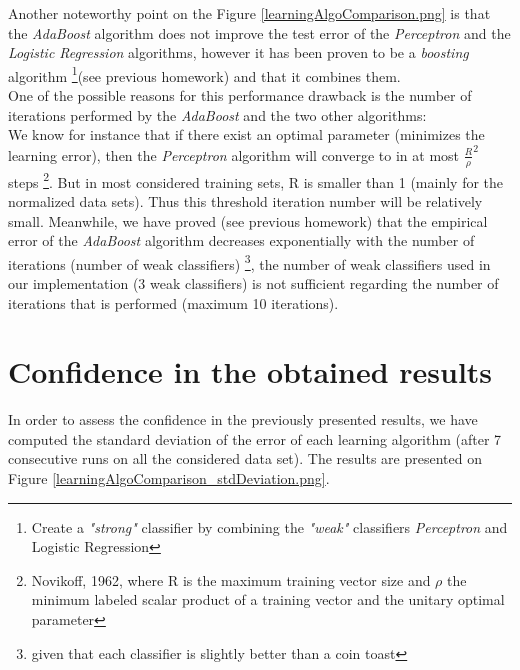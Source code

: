\documentclass[12pt]{article}											%
\begin{document}
Another noteworthy point on the Figure \ref{learningAlgoComparison.png} is that the \emph{AdaBoost} algorithm does not improve the test error of the \emph{Perceptron} and the \emph{Logistic Regression} algorithms, however it has been proven to be a \emph{boosting} algorithm \footnote{Create a \emph{"strong"} classifier by combining the \emph{"weak"} classifiers \emph{Perceptron} and Logistic Regression }(see previous homework) and that it combines them.\\
One of the possible reasons for this performance drawback is the number of iterations performed by the \emph{AdaBoost} and the two other algorithms:\\
We know for instance that if there exist an optimal parameter (minimizes the learning error), then the \emph{Perceptron} algorithm will converge to in at most $\frac{R}{\rho} ^2$ steps \footnote{Novikoff, 1962, where R is the maximum training vector size and $\rho$ the minimum labeled scalar product of a training vector and the unitary optimal parameter}.   But in most considered training sets, R is smaller than 1 (mainly for the normalized data sets).   Thus this threshold iteration number will be relatively small.
Meanwhile, we have proved (see previous homework) that the empirical error of the \emph{AdaBoost} algorithm decreases exponentially with the number of iterations (number of weak classifiers) \footnote{given that each classifier is slightly better than a coin toast}, the number of weak classifiers used in our implementation (3 weak classifiers) is not sufficient regarding the number of iterations that is performed (maximum 10 iterations).


\section{Confidence in the obtained results}
In order to assess the confidence in the previously presented results, we have computed the standard deviation of the error of each learning algorithm (after 7 consecutive runs on all the considered data set).   The results are presented on Figure \ref{learningAlgoComparison_stdDeviation.png}.
\end{document}
